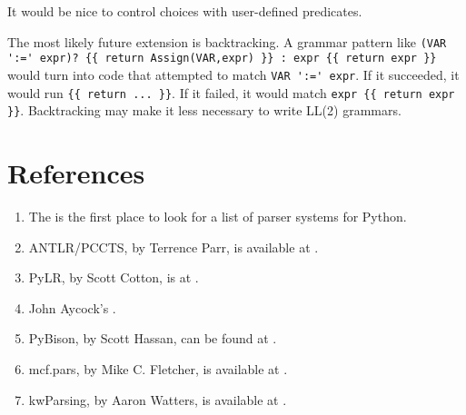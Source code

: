 \documentclass[10pt]{article}
\newcommand{\mysection}[1]{\section{#1}}
\begin{document}
It would be nice to control choices with user-defined predicates.

The most likely future extension is backtracking.  A grammar pattern
like \verb|(VAR ':=' expr)? {{ return Assign(VAR,expr) }} : expr {{ return expr }}|
would turn into code that attempted to match \verb|VAR ':=' expr|.  If 
it succeeded, it would run \verb|{{ return ... }}|.  If it failed, it
would match \verb|expr {{ return expr }}|.  Backtracking may make it
less necessary to write LL(2) grammars.

\mysection{References}

\begin{enumerate}
 \item The  is the first place
   to look for a list of parser systems for Python.
    
  \item ANTLR/PCCTS, by Terrence Parr, is available at
  .
  
  \item PyLR, by Scott Cotton, is at .
  
  \item John Aycock's .

  \item PyBison, by Scott Hassan, can be found at
  .
  
  \item mcf.pars, by Mike C. Fletcher, is available at
  .
  
  \item kwParsing, by Aaron Watters, is available at
  .
\end{enumerate}
\end{document}
